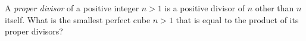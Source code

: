 A \emph{proper divisor} of a positive integer $n>1$ is a positive divisor of $n$ other than $n$ itself. What is the smallest perfect cube $n>1$ that is equal to the product of its proper divisors?
